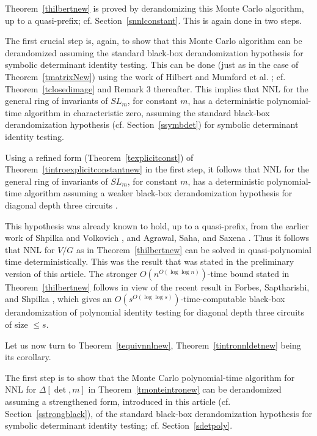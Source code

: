 \documentclass[11pt]{article}
\begin{document}
Theorem~\ref{thilbertnew} is proved by derandomizing this Monte Carlo algorithm, up to a quasi-prefix; cf. 
Section~\ref{snnlconstant}.
This is again done in two steps.

The first  crucial step is, again,  to show that this Monte Carlo algorithm can be derandomized assuming the standard 
black-box derandomization hypothesis for symbolic determinant identity testing. 
This can be done (just as in the case of Theorem~\ref{tmatrixNew})
using the work of Hilbert \cite{hilbert} and Mumford et al. \cite{mumford}; cf. Theorem~\ref{tclosedimage} and Remark 3 thereafter.
This implies that NNL for the general ring of invariants of $SL_m$, for constant $m$,  has a deterministic polynomial-time algorithm 
in characteristic zero,
assuming the standard black-box derandomization hypothesis (cf. Section~\ref{ssymbdet})
for symbolic determinant identity testing.

Using a refined form (Theorem~\ref{texplicitconst}) of Theorem~\ref{tintroexplicitconstantnew} in the first step, it follows
that NNL for the general ring of invariants of $SL_m$, for constant $m$,  has a deterministic polynomial-time algorithm 
assuming a  weaker  black-box derandomization hypothesis for diagonal depth three circuits \cite{saxena}.

This  hypothesis was already known to hold, up to a quasi-prefix, from 
the earlier work of Shpilka and Volkovich \cite{amir}, and  Agrawal, Saha, and Saxena \cite{manindra}.
Thus it follows that NNL for $V/G$ as in Theorem~\ref{thilbertnew}
can be solved in quasi-polynomial time deterministically. This was the result that was stated in the preliminary version
\cite{GCT5focs} of this article.
The 
stronger $O(n^{O(\log \log n)})$-time bound
stated in Theorem~\ref{thilbertnew} follows
in view of  the recent  result in Forbes, Saptharishi, and Shpilka
\cite{fs1}, which  gives an $O(s^{O(\log \log s)})$-time-computable black-box derandomization
of polynomial identity testing for diagonal depth three circuits of size $\le s$. 


Let us now turn to Theorem~\ref{tequivnnlnew}, Theorem~\ref{tintronnldetnew} being its corollary.

The first step is to show that 
the  Monte Carlo polynomial-time algorithm for NNL for $\Delta[\det,m]$ in Theorem~\ref{tmonteintronew} can 
be derandomized assuming a strengthened form, introduced in this article (cf. Section~\ref{sstrongblack}),
of the standard black-box derandomization hypothesis \cite{schnorr,impa,russell,agrawal} for 
symbolic determinant  identity testing; cf. Section~\ref{sdetpoly}.
\end{document}
